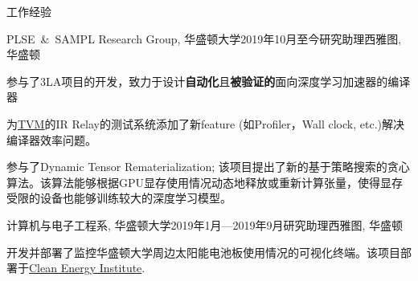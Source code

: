 \documentclass{resume}
\begin{document}
\begin{CJK*}{UTF8}{gbsn}

	\begin{rSection}{工作经验}



		\begin{rSubsection}{PLSE\ \&\ SAMPL Research Group, 华盛顿大学}{2019年10月至今}{研究助理}{西雅图, 华盛顿} 
			\item 参与了3LA项目的开发，致力于设计\textbf{自动化}且\textbf{被验证的}面向深度学习加速器的编译器
			\item 为\href{https://tvm.ai}{TVM}的IR Relay的测试系统添加了新feature (如Profiler，Wall clock, etc.)解决编译器效率问题。
			\item 参与了Dynamic Tensor Rematerialization; 该项目提出了新的基于策略搜索的贪心算法。该算法能够根据GPU显存使用情况动态地释放或重新计算张量，使得显存受限的设备也能够训练较大的深度学习模型。
		\end{rSubsection}
		\vspace{-5pt}


		\begin{rSubsection}{计算机与电子工程系, 华盛顿大学}{2019年1月---2019年9月}{研究助理}{西雅图, 华盛顿}
			\item 开发并部署了监控华盛顿大学周边太阳能电池板使用情况的可视化终端。该项目部署于\href{https://www.cei.washington.edu/}{Clean Energy Institute}.
		\end{rSubsection}
		\vspace{-5pt}


	\end{rSection}
	\vspace{-5pt}


\end{CJK*}
\end{document}
